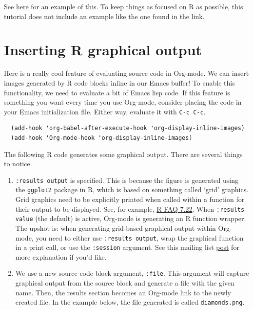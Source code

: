 \documentclass[11pt]{article}
\begin{document}
See \href{http://orgmode.org/worg/org-contrib/babel/intro.php#meta-programming-language}{here} for an example of this. To keep things as focused on R as
possible, this tutorial does not include an example like the one found
in the link.
\section*{Inserting R graphical output}
\label{sec-5}

Here is a really cool feature of evaluating source code in
Org-mode. We can insert images generated by R code blocks inline in
our Emacs buffer! To enable this functionality, we need to evaluate a
bit of Emacs lisp code. If this feature is something you want every
time you use Org-mode, consider placing the code in your Emacs
initialization file. Either way, evaluate it with \texttt{C-c C-c}.

\begin{verbatim}
  (add-hook 'org-babel-after-execute-hook 'org-display-inline-images)   
  (add-hook 'Org-mode-hook 'org-display-inline-images)
\end{verbatim}

The following R code generates some graphical output. There are
several things to notice.

\begin{enumerate}
\item \texttt{:results output} is specified. This is because the figure is
generated using the \texttt{ggplot2} package in R, which is based on
something called `grid' graphics. Grid graphics need to be
explicitly printed when called within a function for their output
to be displayed. See, for example, \href{http://cran.r-project.org/doc/FAQ/R-FAQ.html#Why-do-lattice_002ftrellis-graphics-not-work_003f}{R FAQ 7.22}. When \texttt{:results
   value} (the default) is active, Org-mode is generating an R
function wrapper. The upshot is: when generating grid-based
graphical output within Org-mode, you need to either use \texttt{:results
   output}, wrap the graphical function in a print call, or use the
\texttt{:session} argument. See this mailing list \href{http://www.mail-archive.com/emacs-orgmode@gnu.org/msg25944.html}{post} for more
explanation if you'd like.

\item We use a new source code block argument, \texttt{:file}. This argument
will capture graphical output from the source block and generate a
file with the given name. Then, the results section becomes an
Org-mode link to the newly created file. In the example below, the
file generated is called \texttt{diamonds.png}.
\end{enumerate}
\end{document}
